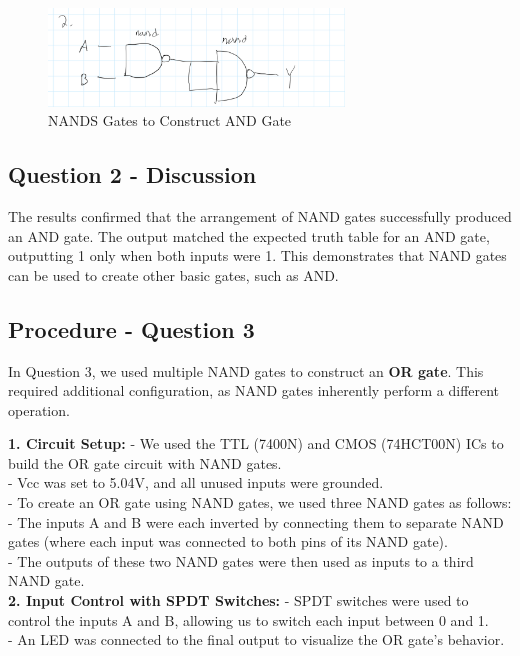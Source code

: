 \documentclass{article}
\begin{document}
   \begin{figure}[H]
        \centering
        \includegraphics[width=0.7\textwidth]{./img/Lab 10/10_2_1.png}
        \caption{NANDS Gates to Construct AND Gate}
        \label{fig:and_gate}
    \end{figure}
   
   \subsection*{\textbf{Question 2 - Discussion}}
   The results confirmed that the arrangement of NAND gates successfully produced an AND gate. The output matched the expected truth table for an AND gate, outputting 1 only when both inputs were 1. This demonstrates that NAND gates can be used to create other basic gates, such as AND.
   
   \subsection*{\textbf{Procedure - Question 3}}
   In Question 3, we used multiple NAND gates to construct an \textbf{OR gate}. This required additional configuration, as NAND gates inherently perform a different operation.
   
   \textbf{1. Circuit Setup:}
      - We used the TTL (7400N) and CMOS (74HCT00N) ICs to build the OR gate circuit with NAND gates.
      \\
      - Vcc was set to 5.04V, and all unused inputs were grounded.
      \\
      - To create an OR gate using NAND gates, we used three NAND gates as follows:
      \\
        - The inputs A and B were each inverted by connecting them to separate NAND gates (where each input was connected to both pins of its NAND gate).
        \\
        - The outputs of these two NAND gates were then used as inputs to a third NAND gate.
        \\
   
   \textbf{2. Input Control with SPDT Switches:}
      - SPDT switches were used to control the inputs A and B, allowing us to switch each input between 0 and 1.
      \\
      - An LED was connected to the final output to visualize the OR gate's behavior.
      \\
   
\end{document}
